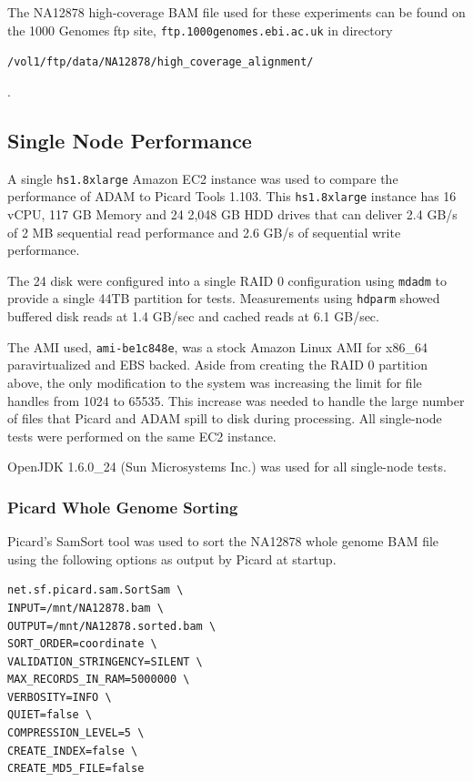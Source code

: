 \documentclass[10pt,twocolumn]{article}
\theoremstyle{plain}
\begin{document}
The NA12878 high-coverage BAM file used for these experiments can be found on the 1000 Genomes ftp site, 
\texttt{ftp.1000genomes.ebi.ac.uk} in directory \begin{small}\texttt{/vol1/ftp/data/NA12878/high\_coverage\_alignment/}\end{small}.

\subsection{Single Node Performance}

A single \texttt{hs1.8xlarge} Amazon EC2 instance was used to compare the performance of ADAM to Picard Tools 1.103.
This \texttt{hs1.8xlarge} instance has 16 vCPU, 117 GB Memory and 24 2,048 GB HDD drives that can
deliver 2.4 GB/s of 2 MB sequential read performance and 2.6 GB/s of sequential write performance. 

The 24 disk were configured into a single RAID 0 configuration using \texttt{mdadm} to provide a single 44TB partition for tests.
Measurements using \texttt{hdparm} showed buffered disk reads at 1.4 GB/sec and cached reads at 6.1 GB/sec.

The AMI used, \texttt{ami-be1c848e}, was a stock Amazon Linux AMI for x86\_64 paravirtualized and EBS backed. Aside
from creating the RAID 0 partition above, the only modification to the system was increasing the limit for file
handles from 1024 to 65535. This increase was needed to handle the large number of files that Picard and ADAM spill to disk during
processing. All single-node tests were performed on the same EC2 instance.

OpenJDK 1.6.0\_24 (Sun Microsystems Inc.) was used for all single-node tests.

\subsubsection{Picard Whole Genome Sorting}
\label{sec:single-sort-picard}

Picard's SamSort tool was used to sort the NA12878 whole genome BAM file using the following options as output
by Picard at startup.

\begin{lstlisting}
net.sf.picard.sam.SortSam \
INPUT=/mnt/NA12878.bam \
OUTPUT=/mnt/NA12878.sorted.bam \
SORT_ORDER=coordinate \
VALIDATION_STRINGENCY=SILENT \
MAX_RECORDS_IN_RAM=5000000 \
VERBOSITY=INFO \
QUIET=false \
COMPRESSION_LEVEL=5 \
CREATE_INDEX=false \
CREATE_MD5_FILE=false
\end{lstlisting}
\end{document}
